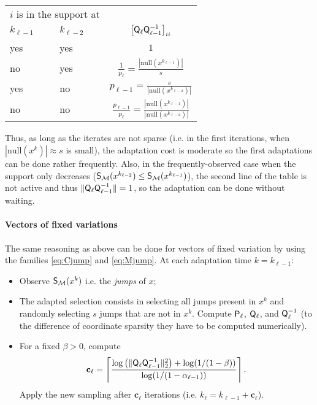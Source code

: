 {\begin{center}
\smallskip
\begin{tabular}{p{}|p{}|c}
   \multicolumn{2}{c}{$i$ is in the support at} & \\%
   ${k_{\ell -1}}$ & ${k_{\ell -2}}$ &  $\left[\bQ_\ell   \bQ_{\ell-1}^{-1}\right]_{ii}$\\
    \hline
   yes & yes &  $1$  \\
    \hline
   no & yes &  $\frac{1}{p_{\ell}} = \frac{|\mathrm{null}(x^{k_{\ell-1}})|}{s}$ \\
    \hline
    yes  & no & ${p_{\ell-1}} = \frac{s}{|\mathrm{null}(x^{k_{\ell-2}})|}$\\
    \hline
    no & no & $\frac{p_{\ell-1}}{p_{\ell}} = \frac{|\mathrm{null}(x^{k_{\ell-1}})|}{|\mathrm{null}(x^{k_{\ell-2}})|}$
\end{tabular}
\smallskip
\end{center}
Thus, as long as the iterates are not sparse (i.e. in the first iterations, when $|\mathrm{null}(x^k)|\approx s$ is small), the adaptation cost is moderate so the first adaptations can be done rather frequently. Also, in the frequently-observed case when the support only decreases ($\S(x^{k_{\ell-2}})\leq \S(x^{k_{\ell-1}})$), the second line of the table is not active and thus $\|\bQ_\ell  \bQ_{\ell-1}^{-1}\| = 1$, so the adaptation can be done without waiting.

\paragraph{Vectors of fixed variations}
\label{Pex:TV}

The same reasoning as above can be done for vectors of fixed variation by using the families \eqref{eq:Cjump} and \eqref{eq:Mjump}. At each adaptation time $k = k_{\ell-1}$:
\begin{itemize}
    \item Observe $\SC(x^{k})$ i.e. the \emph{jumps} of $x$;
    \item The adapted selection consists in selecting all jumps present in $x^k$ and randomly selecting $s$ jumps that are not in $x^k$. Compute $\bP_\ell  $, $\bQ_\ell$, and $\bQ_\ell^{-1}$ (to the difference of coordinate sparsity they have to be computed numerically). 
    \item For a fixed $\beta>0$, compute
    \begin{align*}
        \mathbf{c}_\ell = \left\lceil \frac{\log\left(\|  \bQ_\ell   \bQ_{\ell-1}^{-1} \|_2^2 \right) + \log(1/(1-\beta)) }{\log( 1/(1-\alpha_{\ell-1}))}\right\rceil.
    \end{align*}  
     Apply the new sampling %
     after $\mathbf{c}_\ell$ iterations (i.e. $k_{\ell} = k_{\ell-1}+\mathbf{c}_\ell$).
\end{itemize}
}


